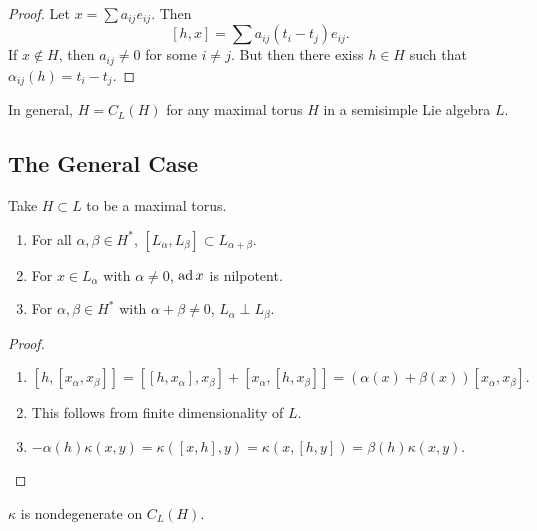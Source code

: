 \documentclass[twoside, 10pt]{article}
\begin{document}
    \begin{proof}
        Let $x = \sum a_{ij} e_{ij}$. Then
        \[ [h,x] = \sum a_{ij}(t_i-t_j)e_{ij}.\] If $x \notin H$, then $a_{ij} \neq 0$ for some $i \neq j$. But then there exiss $h \in H$ such that $\alpha_{ij}(h) = t_i-t_j$.
    \end{proof}    

    \begin{thm}
        In general, $H = C_L(H)$ for any maximal torus $H$ in a semisimple Lie algebra $L$.
    \end{thm}
    
    \subsection{The General Case}%
    \label{sub:the_general_case}
    
    Take $H \subset L$ to be a maximal torus.

    \begin{prop}
        \begin{enumerate}
            \item For all $\alpha, \beta \in H^*$, $[L_{\alpha}, L_{\beta}] \subset L_{\alpha + \beta}$.
            \item For $x \in L_{\alpha}$ with $\alpha \neq 0$, $\operatorname{ad} x$ is nilpotent.
            \item For $\alpha, \beta \in H^*$ with $\alpha + \beta \neq 0$, $L_{\alpha} \perp L_{\beta}$.
        \end{enumerate}
    \end{prop}

    \begin{proof}
        \begin{enumerate}
            \item $ [h,[x_{\alpha},x_{\beta}]] = [[h,x_{\alpha}],x_{\beta}] + [x_{\alpha}, [h,x_{\beta}]] = (\alpha(x) + \beta(x))[x_{\alpha},x_{\beta}].$
            \item This follows from finite dimensionality of $L$.
            \item $ -\alpha(h)\kappa(x,y) = \kappa([x,h],y) = \kappa(x,[h,y]) = \beta(h) \kappa(x,y).$ \qedhere
        \end{enumerate}
    \end{proof}

    \begin{cor}
        $\kappa$ is nondegenerate on $C_L(H)$.
    \end{cor}
\end{document}
